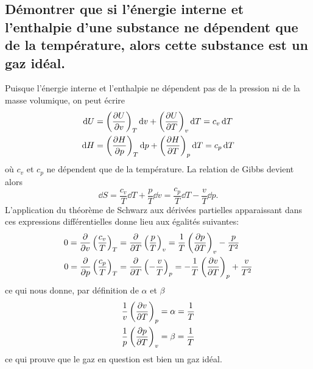 \subsection{Démontrer que si l'énergie interne et l'enthalpie d'une substance
ne dépendent que de la température, alors cette substance est un gaz idéal.}
Puisque l'énergie interne et l'enthalpie ne dépendent pas de la pression ni de la masse volumique,
on peut écrire
\begin{align*}
	\dd{U} &= \left(\pdv{U}{v}\right)_{T}\dd{v} + \left(\pdv{U}{T}\right)_{v}\dd{T} = c_v\dd{T} \\
	\dd{H} &= \left(\pdv{H}{p}\right)_{T}\dd{p} + \left(\pdv{H}{T}\right)_{p}\dd{T} = c_p\dd{T}
\end{align*}
où $c_v$ et $c_p$ ne dépendent que de la température.
La relation de Gibbs devient alors
\[ \dd{S} = \frac{c_v}{T}\dd{T} + \frac{p}{T}\dd{v} = \frac{c_p}{T}\dd{T} - \frac{v}{T}\dd{p}. \]
L'application du théorème de Schwarz aux dérivées partielles apparaissant
dans ces expressions différentielles donne lieu aux égalités suivantes:
\begin{align*}
	0 = \pdv{v}\left(\frac{c_v}{T}\right)_T &= \pdv{T}\left(\frac{p}{T}\right)_v
	= \frac{1}{T}\left(\pdv{p}{T}\right)_{v} - \frac{p}{T^2}
	\\
	0 = \pdv{p}\left(\frac{c_p}{T}\right)_T &= \pdv{T}\left(-\frac{v}{T}\right)_p
	= -\frac{1}{T}\left(\pdv{v}{T}\right)_{p} + \frac{v}{T^2}
\end{align*}
ce qui nous donne, par définition de $\alpha$ et $\beta$
\begin{align*}
	\frac{1}{v}\left(\pdv{v}{T}\right)_{p} &= \alpha = \frac{1}{T} \\
	\frac{1}{p}\left(\pdv{p}{T}\right)_{v} &= \beta  = \frac{1}{T}
\end{align*}
ce qui prouve que le gaz en question est bien un gaz idéal.

\iffalse
On reprend les expressions de la différentielle de l'entropie qui peuvent s'écrire comme suit
pour un gaz idéal:
\[ \d{S} = \frac{R}{v}\d{v} + \frac{c_v}{T}\d{T} = -\frac{R}{p}\d{p} + \frac{c_p}{T}\d{T}
= \frac{c_v}{p}\d{p} + \frac{c_p}{v}\d{v} \]
L'application du théorème de Schwarz aux dérivées partielles apparaissant dans ces expressions
différentielles donne lieu aux égalités suivantes:
\begin{align*}
	\pdv{S}{v}{T} &= \frac{1}{T}\pdv{c_v}{v} = 
	\pdv{S}{T}{v} = \pdv{T}\left(\frac{R}{v}\right) = 0 \\
	\pdv{S}{p}{T} &= \frac{1}{T}\pdv{c_p}{p} = 
	\pdv{S}{T}{p} = \pdv{T}\left(-\frac{R}{p}\right) = 0 \\
\end{align*}
Pour l'état gazeux idéal, les chaleurs massiques $c_p$ et $c_v$ sont donc indépendantes
du volume massique et de la pression.
\fi

